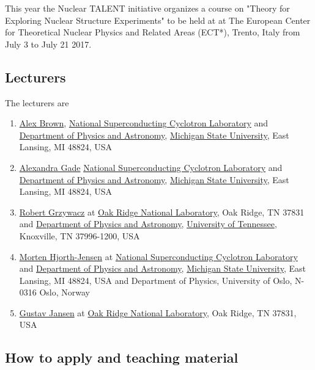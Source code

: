 \documentclass[%
oneside,                 %
final,                   %
10pt]{article}
\begin{document}
This year the Nuclear TALENT initiative organizes a course on 
"Theory for Exploring Nuclear Structure Experiments" to be held at
at The European Center for Theoretical Nuclear Physics and Related Areas
(ECT*), Trento, Italy from July 3 to July 21 2017. 

\subsection{Lecturers}
The lecturers are 
\begin{enumerate}
\item \href{{https://people.nscl.msu.edu/~brown/}}{Alex Brown}, \href{{http://www.nscl.msu.edu/}}{National Superconducting Cyclotron Laboratory} and \href{{https://www.pa.msu.edu/}}{Department of Physics and Astronomy}, \href{{http://www.msu.edu/}}{Michigan State University}, East Lansing, MI 48824, USA

\item \href{{https://people.nscl.msu.edu/~gade/}}{Alexandra Gade}  \href{{http://www.nscl.msu.edu/}}{National Superconducting Cyclotron Laboratory} and \href{{https://www.pa.msu.edu/}}{Department of Physics and Astronomy}, \href{{http://www.msu.edu/}}{Michigan State University}, East Lansing, MI 48824, USA

\item \href{{http://web.utk.edu/~rgrzywac/}}{Robert Grzywacz}  at \href{{http://www.ornl.gov/}}{Oak Ridge National Laboratory}, Oak Ridge, TN 37831  and \href{{https://www.phys.utk.edu/}}{Department of Physics and Astronomy}, \href{{http://www.utk.edu/}}{University of Tennessee}, Knoxville, TN 37996-1200, USA

\item \href{{http://mhjgit.github.io/info/doc/web/}}{Morten Hjorth-Jensen}  at \href{{http://www.nscl.msu.edu/}}{National Superconducting Cyclotron Laboratory} and \href{{https://www.pa.msu.edu/}}{Department of Physics and Astronomy}, \href{{http://www.msu.edu/}}{Michigan State University}, East Lansing, MI 48824, USA and  Department of Physics, University of Oslo, N-0316 Oslo, Norway

\item \href{{https://www.ornl.gov/staff-profile/gustav-r-jansen}}{Gustav Jansen}  at \href{{http://www.ornl.gov/}}{Oak Ridge National Laboratory}, Oak Ridge, TN 37831, USA
\end{enumerate}

\noindent
\subsection{How to apply and teaching material}
\end{document}
